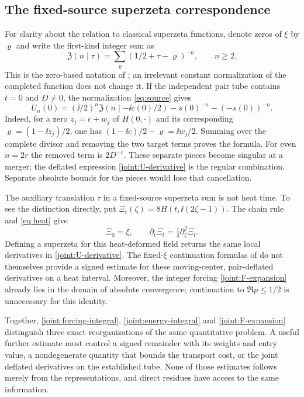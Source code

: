 \subsection{The fixed-source superzeta correspondence}

For clarity about the relation to classical superzeta functions, denote
zeros of $\xi$ by $\varrho$ and write the first-kind integer sum as
\[
 \mathfrak Z(n\mid\tau)=\sum_{\varrho}
              (1/2+\tau-\varrho)^{-n},\qquad n\ge2.
\]
This is the zero-based notation of \cite{Voros2014SuperzetaReview}; an
irrelevant constant normalization of the completed function does not
change it. If the independent pair tube contains $t=0$ and $D\ne0$, the
normalization \eqref{eq:source} gives
\begin{equation}
 U_n(0)=(\ii/2)^n\mathfrak Z(n\mid-\ii c(0)/2)
                     -s(0)^{-n}-(-s(0))^{-n}.
 \label{joint:superzeta-transfer}
\end{equation}
Indeed, for a zero $z_j=c+w_j$ of $H(0,\cdot)$ and its corresponding
$\varrho=(1-\ii z_j)/2$, one has
$(1-\ii c)/2-\varrho=\ii w_j/2$. Summing over the complete divisor
and removing the two target terms proves the formula. For even $n=2r$
the removed term is $2D^{-r}$. These separate pieces become singular at
a merger; the deflated expression \eqref{joint:U-derivative} is the
regular combination. Separate absolute bounds for the pieces would lose
that cancellation.

The auxiliary translation $\tau$ in a fixed-source superzeta sum is not
heat time. To see the distinction directly, put
$\Xi_t(\zeta)=8H(t,\ii(2\zeta-1))$. The chain rule and
\eqref{eq:heat} give
\begin{equation}
 \Xi_0=\xi,\qquad \partial_t\Xi_t=\tfrac14\partial_\zeta^2\Xi_t.
 \label{joint:Xi-heat}
\end{equation}
Defining a superzeta for this heat-deformed field returns the same local
derivatives in \eqref{joint:U-derivative}. The fixed-$\xi$ continuation
formulas of \cite{Voros2014SuperzetaReview} do not themselves provide a
signed estimate for these moving-center, pair-deflated derivatives on a
heat interval. Moreover, the integer forcing
\eqref{joint:F-expansion} already lies in the domain of absolute
convergence; continuation to $\Re p\le1/2$ is unnecessary for this
identity.

Together, \eqref{joint:forcing-integral}, \eqref{joint:energy-integral}
and \eqref{joint:F-expansion} distinguish three exact reorganizations
of the same quantitative problem. A useful further estimate must control
a signed remainder with its weights and entry value, a nondegenerate
quantity that bounds the transport cost, or the joint deflated derivatives
on the established tube. None of those estimates follows merely from the
representations, and direct residues have access to the same information.
